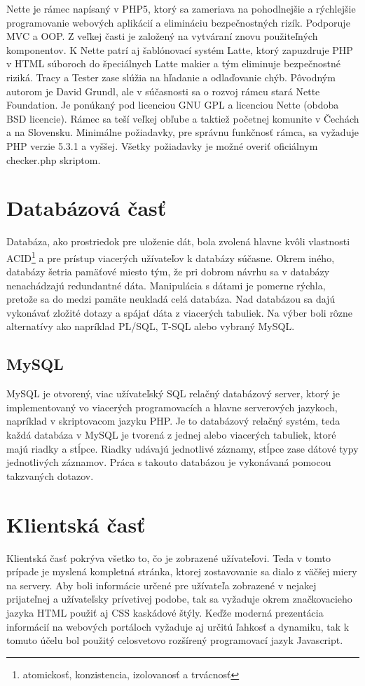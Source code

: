 Nette je rámec napísaný v PHP5, ktorý sa zameriava na pohodlnejšie a rýchlejšie programovanie webových aplikácií a elimináciu bezpečnostných rizík. Podporuje MVC a OOP. Z veľkej časti je založený na vytváraní znovu použiteľných komponentov. K Nette patrí aj šablónovací systém Latte, ktorý zapuzdruje PHP v HTML súboroch do špeciálnych Latte makier a tým eliminuje bezpečnostné riziká. Tracy a Tester zase slúžia na hľadanie a odlaďovanie chýb. Pôvodným autorom je David Grundl, ale v súčasnosti sa o rozvoj rámcu stará Nette Foundation. Je ponúkaný pod licenciou GNU GPL a licenciou Nette (obdoba BSD licencie). Rámec sa teší veľkej obľube a taktiež početnej komunite v Čechách a na Slovensku. Minimálne požiadavky, pre správnu funkčnosť rámca, sa vyžaduje PHP verzie 5.3.1 a vyššej. Všetky požiadavky je možné overiť oficiálnym checker.php skriptom.

\section{Databázová časť}
\label{sec:databaza}
Databáza, ako prostriedok pre uloženie dát, bola zvolená hlavne kvôli vlastnosti ACID\footnote{atomickosť, konzistencia, izolovanosť a trvácnosť} a pre prístup viacerých užívateľov k databázy súčasne. Okrem iného, databázy šetria pamäťové miesto tým, že pri dobrom návrhu sa v databázy nenachádzajú redundantné dáta. Manipulácia s dátami je pomerne rýchla, pretože sa do medzi pamäte neukladá celá databáza. Nad databázou sa dajú vykonávať zložité dotazy a spájať dáta z viacerých tabuliek.  Na výber boli rôzne alternatívy ako napríklad PL/SQL, T-SQL alebo vybraný MySQL.   

\subsection{MySQL}
\label{sec:mysql}
MySQL je otvorený, viac užívateľský SQL relačný databázový server, ktorý je implementovaný vo viacerých programovacích a hlavne serverových jazykoch, napríklad v skriptovacom jazyku PHP. Je to databázový relačný systém, teda každá databáza v MySQL je tvorená z jednej alebo viacerých tabuliek, ktoré majú riadky a stĺpce. Riadky udávajú jednotlivé záznamy, stĺpce zase dátové typy jednotlivých záznamov. Práca s takouto databázou je vykonávaná pomocou takzvaných dotazov.

\section{Klientská časť}
\label{sec:klient}
Klientská časť pokrýva všetko to, čo je zobrazené užívateľovi. Teda v tomto prípade je myslená kompletná stránka, ktorej zostavovanie sa dialo z väčšej miery na servery. Aby boli informácie určené pre užívateľa zobrazené v nejakej prijateľnej a užívateľsky prívetivej podobe, tak sa vyžaduje okrem značkovacieho jazyka HTML použiť aj CSS kaskádové štýly. Keďže moderná prezentácia informácií na webových portáloch vyžaduje aj určitú ľahkosť a dynamiku, tak k tomuto účelu bol použitý celosvetovo rozšírený programovací jazyk Javascript.


